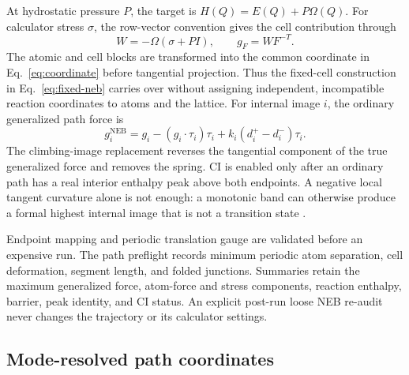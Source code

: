 \documentclass[final,5p,times,twocolumn]{elsarticle}
\begin{document}
At hydrostatic pressure $P$, the target is $H(Q)=E(Q)+P\Omega(Q)$. For
calculator stress $\sigma$, the row-vector convention gives the cell
contribution through
\begin{equation}
 W=-\Omega(\sigma+PI),\qquad g_F=WF^{-T}.
 \label{eq:cellforce}
\end{equation}
The atomic and cell blocks are transformed into the common coordinate in
Eq.~\ref{eq:coordinate} before tangential projection.  Thus the fixed-cell
construction in Eq.~\ref{eq:fixed-neb} carries over without assigning
independent, incompatible reaction coordinates to atoms and the lattice.  For
internal image $i$, the ordinary generalized path force is
\begin{equation}
 g_i^{\mathrm{NEB}}=g_i-(g_i\cdot\tau_i)\tau_i+
 k_i(d_i^+-d_i^-)\tau_i.
 \label{eq:nebforce}
\end{equation}
The climbing-image replacement reverses the tangential component of the true
generalized force and removes the spring. CI is enabled only after an ordinary
path has a real interior enthalpy peak above both endpoints. A negative local
tangent curvature alone is not enough: a monotonic band can otherwise produce
a formal highest internal image that is not a transition state
\cite{Henkelman2000}.

Endpoint mapping and periodic translation gauge are validated before an
expensive run. The path preflight records minimum periodic atom separation,
cell deformation, segment length, and folded junctions. Summaries retain the
maximum generalized force, atom-force and stress components, reaction enthalpy,
barrier, peak identity, and CI status. An explicit post-run loose NEB re-audit
never changes the trajectory or its calculator settings.

\subsection{Mode-resolved path coordinates}
\label{sec:modes}
\end{document}
